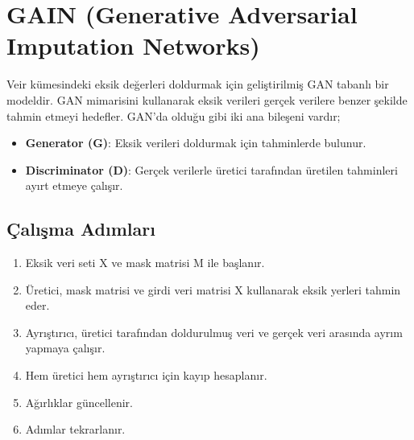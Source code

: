 \section{GAIN (Generative Adversarial Imputation Networks)}
Veir kümesindeki eksik değerleri doldurmak için geliştirilmiş GAN tabanlı bir modeldir. GAN mimarisini kullanarak eksik verileri gerçek verilere benzer şekilde tahmin etmeyi hedefler. GAN'da olduğu gibi iki ana bileşeni vardır;

\begin{itemize}
	\item \textbf{Generator (G)}: Eksik verileri doldurmak için tahminlerde bulunur.
	\item \textbf{Discriminator (D)}: Gerçek verilerle üretici tarafından üretilen tahminleri ayırt etmeye çalışır.
\end{itemize}

\subsection{Çalışma Adımları}
\begin{enumerate}
	\item Eksik veri seti X ve mask matrisi M ile başlanır.
	\item Üretici, mask matrisi ve girdi veri matrisi X kullanarak eksik yerleri tahmin eder.
	\item Ayrıştırıcı, üretici tarafından doldurulmuş veri ve gerçek veri arasında ayrım yapmaya çalışır.
	\item Hem üretici hem ayrıştırıcı için kayıp hesaplanır.
	\item Ağırlıklar güncellenir.
	\item Adımlar tekrarlanır. 
\end{enumerate}

\newpage